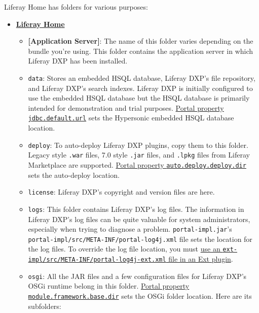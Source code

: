 Liferay Home has folders for various purposes:

\begin{itemize}
\tightlist
\item
  \textbf{\hyperref[liferay-home]{Liferay Home}}

  \begin{itemize}
  \item
    \textbf{{[}Application Server{]}}: The name of this folder varies
    depending on the bundle you're using. This folder contains the
    application server in which Liferay DXP has been installed.
  \item
    \texttt{data}: Stores an embedded HSQL database, Liferay DXP's file
    repository, and Liferay DXP's search indexes. Liferay DXP is
    initially configured to use the embedded HSQL database but the HSQL
    database is primarily intended for demonstration and trial purposes.
    \href{https://docs.liferay.com/dxp/portal/7.1-latest/propertiesdoc/portal.properties.html\#JDBC}{Portal
    property \texttt{jdbc.default.url}} sets the Hypersonic embedded
    HSQL database location.
  \item
    \texttt{deploy}: To auto-deploy Liferay DXP plugins, copy them to
    this folder. Legacy style \texttt{.war} files, 7.0 style
    \texttt{.jar} files, and \texttt{.lpkg} files from Liferay
    Marketplace are supported.
    \href{https://docs.liferay.com/dxp/portal/7.1-latest/propertiesdoc/portal.properties.html\#Auto\%20Deploy}{Portal
    property \texttt{auto.deploy.deploy.dir}} sets the auto-deploy
    location.
  \item
    \texttt{license}: Liferay DXP's copyright and version files are
    here.
  \item
    \texttt{logs}: This folder contains Liferay DXP's log files. The
    information in Liferay DXP's log files can be quite valuable for
    system administrators, especially when trying to diagnose a problem.
    \texttt{portal-impl.jar}'s
    \texttt{portal-impl/src/META-INF/portal-log4j.xml} file sets the
    location for the log files. To override the log file location, you
    must
    \href{/docs/7-0/tutorials/-/knowledge_base/t/advanced-customization-with-ext-plugins\#using-advanced-configuration-files}{use
    an \texttt{ext-impl/src/META-INF/portal-log4j-ext.xml} file in an
    Ext plugin}.
  \item
    \texttt{osgi}: All the JAR files and a few configuration files for
    Liferay DXP's OSGi runtime belong in this folder.
    \href{https://docs.liferay.com/dxp/portal/7.1-latest/propertiesdoc/portal.properties.html\#Module\%20Framework}{Portal
    property \texttt{module.framework.base.dir}} sets the OSGi folder
    location. Here are its subfolders:


\end{itemize}
\end{itemize}
